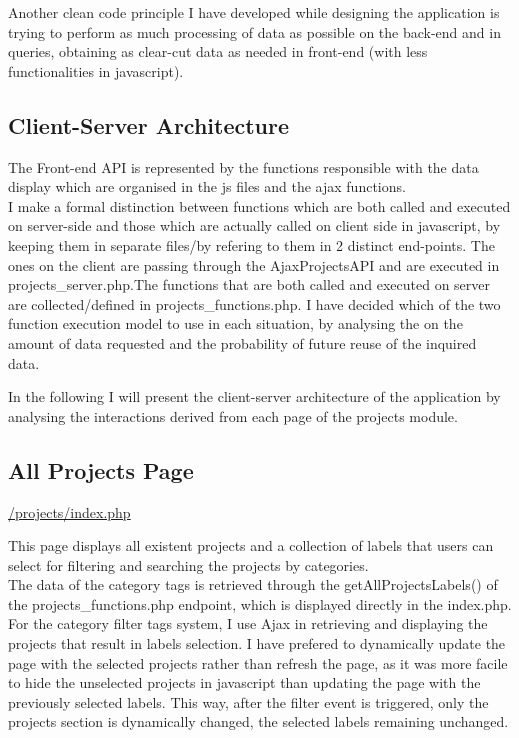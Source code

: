 Another clean code principle I have developed while designing the application is trying to perform as much processing of data as possible on the back-end and in queries, obtaining as clear-cut data as needed in front-end (with less functionalities in javascript). 


\subsection{Client-Server Architecture}

The Front-end API is represented by the functions responsible with the data display which are organised in the js files and the ajax functions. \\

I make a formal distinction between functions which are both called and executed on server-side and those which are actually called on client side in javascript, by keeping them in separate files/by refering to them in 2 distinct end-points. The ones on the client are passing through the AjaxProjectsAPI and are executed in projects\_server.php.The functions that are both called and executed on server are collected/defined in projects\_functions.php.
I have decided which of the two function execution model to use in each situation, by analysing the on the amount of data requested and the probability of future reuse of the inquired data.

In the following I will present the client-server architecture of the application by analysing the interactions derived from each page of the projects module. 

\subsection{All Projects Page}
\url{/projects/index.php}

This page displays all existent projects and a collection of labels that users can select for filtering and searching the projects by categories. \\

The data of the category tags is retrieved through the getAllProjectsLabels() of the projects\_functions.php endpoint, which is displayed directly in the index.php.\\

For the category filter tags system, I use Ajax in retrieving and displaying the projects that result in labels selection. I have prefered to dynamically update the page with the selected projects rather than refresh the page, as it was more facile to hide the unselected projects in javascript than updating the page with the previously selected labels. This way, after the filter event is triggered, only the projects section is dynamically changed, the selected labels remaining unchanged.\\

